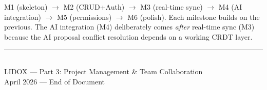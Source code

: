 \documentclass[10pt, a4paper]{article}
\newcommand{\lightrule}{{\color{border}\rule{\textwidth}{0.4pt}}}
\begin{document}
\vspace{8pt}
\begin{notebox}
\small M1 (skeleton) $\to$ M2 (CRUD+Auth) $\to$ M3 (real-time sync) $\to$ M4 (AI integration) $\to$ M5 (permissions) $\to$ M6 (polish). Each milestone builds on the previous. The AI integration (M4) deliberately comes \emph{after} real-time sync (M3) because the AI proposal conflict resolution depends on a working CRDT layer.
\end{notebox}


\vfill\lightrule\vspace{6pt}
\begin{center}
\\[4pt]
{\small\color{inkMuted}\textsf{LIDOX --- Part 3: Project Management \& Team Collaboration}}\\[2pt]
{\scriptsize\color{inkFaint}\textsf{April 2026 --- End of Document}}
\end{center}
\end{document}
